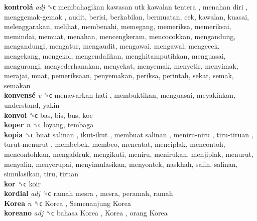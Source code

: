 \textbf{kontrolá} \emph{adj}  ␝ϲ   membahagikan kawasan utk kawalan tentera ,  menahan diri ,  menggemak-gemak , audit, berisi, berkabilan, bermuatan, cek, kawalan, kuasai, melenggarakan, melihat, membenahi, memegang, memeriksa, memeriksai, memindai, memuat, menahan, mencengkeram, mencocokkan, mengandung, mengandungi, mengatur, mengaudit, mengawai, mengawal, mengecek, mengekang, mengekol, mengendalikan, menghitamputihkan, menguasai, mengurangi, menyederhanakan, menyekat, menyemak, menyetir, menyimak, merajai, muat, pemeriksaan, penyemakan, periksa, perintah, sekat, semak, semakan  \\
\textbf{konvensé} \emph{v}  ␝ϲ   menawarkan hati , membuktikan, menguasai, meyakinkan, understand, yakin  \\
\textbf{konvoi} ␝ϲ  bas, bis, bus, koc  \\
\textbf{koper} \emph{n}  ␝ϲ  loyang, tembaga  \\
\textbf{kopia} ␝ϲ   buat salinan ,  ikut-ikut ,  membuat salinan ,  meniru-niru ,  tiru-tiruan ,  turut-menurut , membebek, membeo, mencatat, menciplak, mencontoh, mencontohkan, mengafdruk, mengikuti, meniru, menirukan, menjiplak, menurut, menyalin, menyerupai, menyimulasikan, menyontek, naskhah, salin, salinan, simulasikan, tiru, tiruan  \\
\textbf{kor} ␝ϲ  koir  \\
\textbf{kordial} \emph{adj}  ␝ϲ   ramah mesra , mesra, peramah, ramah  \\
\textbf{Korea} \emph{n}  ␝ϲ   Korea ,  Semenanjung Korea   \\
\textbf{koreano} \emph{adj}  ␝ϲ   bahasa Korea ,  Korea ,  orang Korea   \\
